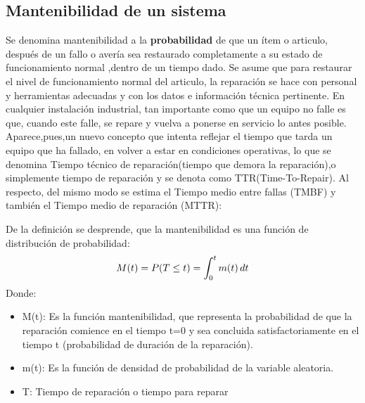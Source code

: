 \documentclass[
	12pt, %
	fleqn, %
	a4paper, %
	oneside, %
]{LegrandOrangeBook}
\begin{document}
\subsection{Mantenibilidad de un sistema}
Se denomina mantenibilidad a la \textbf{probabilidad} de que un ítem o articulo, después de un fallo o avería sea restaurado completamente a su estado de funcionamiento normal ,dentro de un tiempo dado. Se asume que para restaurar el nivel de funcionamiento normal del articulo, la reparación se hace con personal y herramientas adecuadas y con los datos e información técnica pertinente. En cualquier instalación industrial, tan importante como que un equipo no falle es que, cuando este falle, se repare y vuelva a ponerse en servicio lo antes posible. Aparece,pues,un nuevo concepto que intenta reflejar el tiempo que tarda un equipo que ha fallado, en volver a estar en condiciones operativas, lo que se denomina Tiempo técnico de reparación(tiempo que demora la reparación),o simplemente tiempo de reparación y se denota como TTR(Time-To-Repair). Al respecto, del mismo modo se estima el Tiempo medio entre fallas (TMBF) y
también el Tiempo medio de reparación (MTTR):
\begin{definition}[Mantenibilidad]
De la definición se desprende, que la mantenibilidad es una función de distribución de probabilidad:
\begin{equation}
M(t)=P(T\leq t)=\int_0^tm(t)\mathop{}\!d t
\end{equation}
Donde:
\begin{itemize}
\item M(t): Es la función mantenibilidad, que representa la probabilidad de que la reparación comience en el tiempo t=0 y sea concluida satisfactoriamente en el tiempo t (probabilidad de duración de la reparación).
\item m(t): Es la función de densidad de probabilidad de la variable aleatoria.
\item T: Tiempo de reparación o tiempo para reparar
\end{itemize}
\end{definition}
\end{document}
